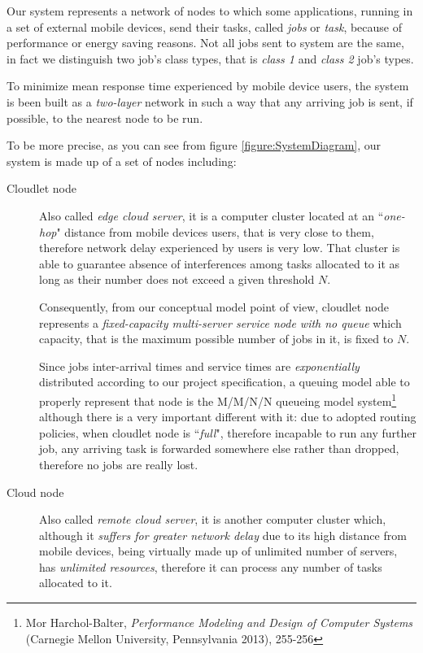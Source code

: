 \documentclass[10pt,a4paper]{article}
\begin{document}
Our system represents a network of nodes to which some applications, running in a set of external mobile devices, send their tasks, called \textit{jobs} or \textit{task}, because of performance or energy saving reasons. Not all jobs sent to system are the same, in fact we distinguish two job's class types, that is \textit{class 1} and \textit{class 2} job's types.

To minimize mean response time experienced by mobile device users, the system is been built as a \textit{two-layer} network in such a way that any arriving job is sent, if possible, to the nearest node to be run.

To be more precise, as you can see from figure \ref{figure:SystemDiagram}, our system is made up of a set of nodes including:

\begin{description}
\item[Cloudlet node] Also called \textit{edge cloud server}, it is a computer cluster located at an ``\textit{one-hop}" distance from mobile devices users, that is very close to them, therefore network delay experienced by users is very low. That cluster is able to guarantee absence of interferences among tasks allocated to it as long as their number does not exceed a given threshold $N$. 

Consequently, from our conceptual model point of view, cloudlet node represents a \textit{fixed-capacity multi-server service node with no queue} which capacity, that is the maximum possible number of jobs in it, is fixed to $N$. 

Since jobs inter-arrival times and service times are \textit{exponentially} distributed according to our project specification, a queuing model able to properly represent that node is the M/M/N/N queueing model system\footnote{Mor Harchol-Balter, \textit{Performance Modeling and Design of Computer Systems} (Carnegie Mellon University, Pennsylvania 2013), 255-256} although there is a very important different with it: due to adopted routing policies, when cloudlet node is ``\textit{full}", therefore incapable to run any further job, any arriving task is forwarded somewhere else rather than dropped, therefore no jobs are really lost.

\item[Cloud node] Also called \textit{remote cloud server}, it is another computer cluster which, although it \textit{suffers for greater network delay} due to its high distance from mobile devices, being virtually made up of unlimited number of servers, has \textit{unlimited resources}, therefore it can process any number of tasks allocated to it. 


\end{description}
\end{document}
